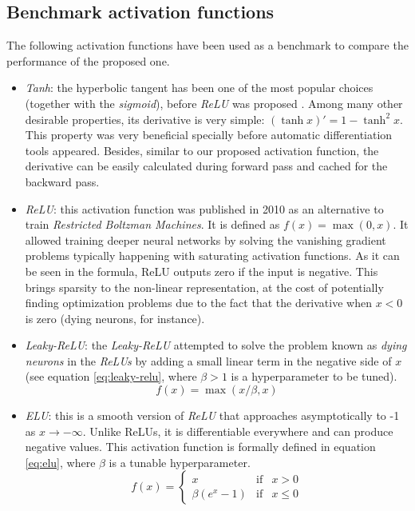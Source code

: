 \documentclass[authoryear]{elsarticle}
\begin{document}
\subsection{Benchmark activation functions}
The following activation functions have been used as a benchmark to compare the performance of the proposed one.


\begin{itemize}
	\item \textit{Tanh}: the hyperbolic tangent has been one of the most popular choices (together with the \textit{sigmoid}), before \textit{ReLU} was proposed \citep{lecun2012}. Among many other desirable properties, its derivative is very simple: $(\tanh x)'=1-\tanh^2 x$. This property was very beneficial specially before automatic differentiation tools appeared. Besides, similar to our proposed activation function, the derivative can be easily calculated during forward pass and cached for the backward pass. 
	\item \textit{ReLU}: this activation function was published in 2010 as an alternative to train \textit{Restricted Boltzman Machines}. It is defined as $f(x) = \max(0,x)$. It allowed training deeper neural networks by solving the vanishing gradient problems typically happening with saturating activation functions. As it can be seen in the formula, ReLU outputs zero if the input is negative. This brings sparsity to the non-linear representation, at the cost of potentially finding optimization problems due to the fact that the derivative when $x<0$ is zero (dying neurons, for instance).
	\item \textit{Leaky-ReLU}: the \textit{Leaky-ReLU} attempted to solve the problem known as \textit{dying neurons} in the \textit{ReLUs} by adding a small linear term in the negative side of $x$ (see equation \ref{eq:leaky-relu}, where $\beta>1$ is a hyperparameter to be tuned).
	\begin{equation} \label{eq:leaky-relu}
		f(x) = \max(x/\beta, x)
	\end{equation}
	\item \textit{ELU}: this is a smooth version of \textit{ReLU} that approaches asymptotically to -1 as $x\rightarrow-\infty$. Unlike ReLUs, it is differentiable everywhere and can produce negative values. This activation function is formally defined in equation \ref{eq:elu}, where $\beta$ is a tunable hyperparameter.
	\begin{equation} \label{eq:elu}
	f(x)= \left\{ \begin{array}{lcc}
		x &   \text{if}  & x > 0 \\
 \beta(e^x - 1) &  \text{if} & x \leq 0 
	\end{array}
	\right.
	\end{equation}
	

\end{itemize}
\end{document}
